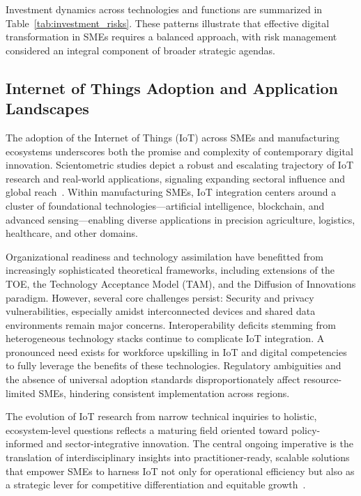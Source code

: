 \documentclass[sigconf]{acmart}
\begin{document}
Investment dynamics across technologies and functions are summarized in Table~\ref{tab:investment_risks}. These patterns illustrate that effective digital transformation in SMEs requires a balanced approach, with risk management considered an integral component of broader strategic agendas.

\subsection{Internet of Things Adoption and Application Landscapes}

The adoption of the Internet of Things (IoT) across SMEs and manufacturing ecosystems underscores both the promise and complexity of contemporary digital innovation. Scientometric studies depict a robust and escalating trajectory of IoT research and real-world applications, signaling expanding sectoral influence and global reach~\cite{ref33}. Within manufacturing SMEs, IoT integration centers around a cluster of foundational technologies---artificial intelligence, blockchain, and advanced sensing---enabling diverse applications in precision agriculture, logistics, healthcare, and other domains.

Organizational readiness and technology assimilation have benefitted from increasingly sophisticated theoretical frameworks, including extensions of the TOE, the Technology Acceptance Model (TAM), and the Diffusion of Innovations paradigm. However, several core challenges persist:
Security and privacy vulnerabilities, especially amidst interconnected devices and shared data environments remain major concerns. Interoperability deficits stemming from heterogeneous technology stacks continue to complicate IoT integration. A pronounced need exists for workforce upskilling in IoT and digital competencies to fully leverage the benefits of these technologies. Regulatory ambiguities and the absence of universal adoption standards disproportionately affect resource-limited SMEs, hindering consistent implementation across regions.

The evolution of IoT research from narrow technical inquiries to holistic, ecosystem-level questions reflects a maturing field oriented toward policy-informed and sector-integrative innovation. The central ongoing imperative is the translation of interdisciplinary insights into practitioner-ready, scalable solutions that empower SMEs to harness IoT not only for operational efficiency but also as a strategic lever for competitive differentiation and equitable growth~\cite{ref33}.
\end{document}
